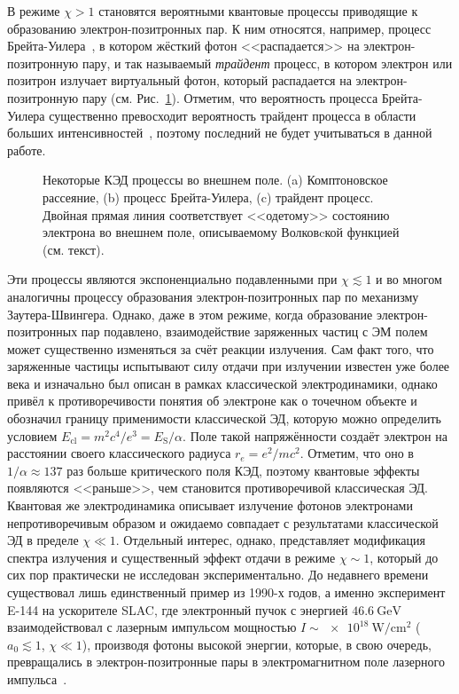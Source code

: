 В режиме $\chi > 1$ становятся вероятными квантовые процессы приводящие к образованию электрон-позитронных пар.
К ним относятся, например, процесс Брейта-Уилера~\cite{breit1934collision}, в котором жёсткий фотон <<распадается>> на электрон-позитронную пару, и так называемый \textit{трайдент} процесс, в котором электрон или позитрон излучает виртуальный фотон, который распадается на электрон-позитронную пару (см. Рис.~\ref{fig:intro/QED}). 
Отметим, что вероятность процесса Брейта-Уилера существенно превосходит вероятность трайдент процесса в области больших интенсивностей~\cite{Bell2008}, поэтому последний не будет учитываться в данной работе.
\begin{figure}[ht]
  \caption[Некоторые КЭД процессы во внешнем поле]{Некоторые КЭД процессы во внешнем поле. (a) Комптоновское рассеяние, (b) процесс Брейта-Уилера, (c) трайдент процесс. Двойная прямая линия соответствует <<одетому>> состоянию электрона во внешнем поле, описываемому Волковcкой функцией (см. текст).}
  \label{fig:intro/QED}
\end{figure}
Эти процессы являются экспоненциально подавленными при $\chi \lesssim 1$ и во многом аналогичны процессу образования электрон-позитронных пар по механизму Заутера-Швингера.
Однако, даже в этом режиме, когда образование электрон-позитронных пар подавлено, взаимодействие заряженных частиц с ЭМ полем может существенно изменяться за счёт реакции излучения.
Сам факт того, что заряженные частицы испытывают силу отдачи при излучении известен уже более века и изначально был описан в рамках классической электродинамики, однако привёл к противоречивости понятия об электроне как о точечном объекте и обозначил границу применимости классической ЭД, которую можно определить условием ${E_\mathrm{cl} = m^2 c^4 / e^3 = E_\mathrm{S} / \alpha}$.
Поле такой напряжённости создаёт электрон на расстоянии своего классического радиуса $r_e = e^2 / m c^2$.
Отметим, что оно в ${1/\alpha \approx 137}$ раз больше критического поля КЭД, поэтому квантовые эффекты появляются <<раньше>>, чем становится противоречивой классическая ЭД. 
Квантовая же электродинамика описывает излучение фотонов электронами непротиворечивым образом и ожидаемо совпадает с результатами классической ЭД в пределе ${\chi\ll1}$.
Отдельный интерес, однако, представляет модификация спектра излучения и существенный эффект отдачи в режиме $\chi \sim 1$, который до сих пор практически не исследован экспериментально.
До недавнего времени существовал лишь единственный пример из 1990-х годов, а именно эксперимент E-144 на ускорителе SLAC, где электронный пучок с энергией $\SI{46.6}{\giga\electronvolt}$ взаимодействовал с лазерным импульсом мощностью ${I\sim\SI{e18}{\watt/\centi\meter^2}}$ ($a_0 \lesssim 1$, $\chi \ll 1$), производя фотоны высокой энергии, которые, в свою очередь, превращались в электрон-позитронные пары в электромагнитном поле лазерного импульса~\cite{bula1996observation, burke1997positron}.
